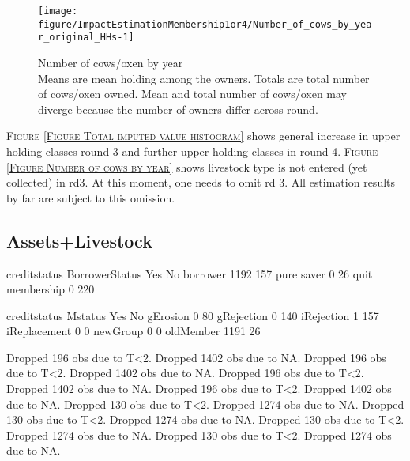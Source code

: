\begin{Schunk}
\begin{figure}

{\centering \texttt{[image: figure/ImpactEstimationMembership1or4/Number\_of\_cows\_by\_year\_original\_HHs-1]} 

}

\caption{Number of cows/oxen by year\\ {\footnotesize Means are mean holding among the owners. Totals are total number of cows/oxen owned. Mean and total number of cows/oxen may diverge because the number of owners differ across round.\setlength{\baselineskip}{8pt}}}\label{Figure Number of cows by year original HHs}
\end{figure}
\end{Schunk}
\begin{palepinkleftbar}
\begin{finding}
\textsc{\small Figure \ref{Figure Total imputed value histogram}} shows general increase in upper holding classes round 3 and further upper holding classes in round 4. \textsc{\small Figure \ref{Figure Number of cows by year}} shows livestock type is not entered (yet collected) in rd3. At this moment, one needs to omit rd 3. All estimation results by far are subject to this omission.
\end{finding}
\end{palepinkleftbar}


\subsection{Assets+Livestock}




\begin{Schunk}
\begin{Soutput}
                 creditstatus
BorrowerStatus     Yes   No
  borrower        1192  157
  pure saver         0   26
  quit membership    0  220
\end{Soutput}
\begin{Soutput}
              creditstatus
Mstatus         Yes   No
  gErosion        0   80
  gRejection      0  140
  iRejection      1  157
  iReplacement    0    0
  newGroup        0    0
  oldMember    1191   26
\end{Soutput}
\begin{Soutput}
Dropped 196 obs due to T<2.
Dropped 1402 obs due to NA.
Dropped 196 obs due to T<2.
Dropped 1402 obs due to NA.
Dropped 196 obs due to T<2.
Dropped 1402 obs due to NA.
Dropped 196 obs due to T<2.
Dropped 1402 obs due to NA.
Dropped 130 obs due to T<2.
Dropped 1274 obs due to NA.
Dropped 130 obs due to T<2.
Dropped 1274 obs due to NA.
Dropped 130 obs due to T<2.
Dropped 1274 obs due to NA.
Dropped 130 obs due to T<2.
Dropped 1274 obs due to NA.
\end{Soutput}
\end{Schunk}

